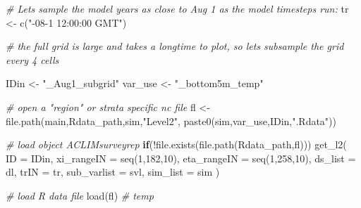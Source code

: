 \documentclass[
]{article}
\newenvironment{Shaded}{\begin{snugshade}}{\end{snugshade}}
\newcommand{\AttributeTok}[1]{\textcolor[rgb]{0.77,0.63,0.00}{#1}}
\newcommand{\CommentTok}[1]{\textcolor[rgb]{0.56,0.35,0.01}{\textit{#1}}}
\newcommand{\ControlFlowTok}[1]{\textcolor[rgb]{0.13,0.29,0.53}{\textbf{#1}}}
\newcommand{\DecValTok}[1]{\textcolor[rgb]{0.00,0.00,0.81}{#1}}
\newcommand{\FunctionTok}[1]{\textcolor[rgb]{0.00,0.00,0.00}{#1}}
\newcommand{\NormalTok}[1]{#1}
\newcommand{\OtherTok}[1]{\textcolor[rgb]{0.56,0.35,0.01}{#1}}
\newcommand{\SpecialCharTok}[1]{\textcolor[rgb]{0.00,0.00,0.00}{#1}}
\newcommand{\StringTok}[1]{\textcolor[rgb]{0.31,0.60,0.02}{#1}}
\begin{document}
\begin{Shaded}
\begin{Highlighting}[]
    
    \CommentTok{\# Let\textquotesingle{}s sample the model years as close to Aug 1 as the model timesteps run:}
\NormalTok{    tr          }\OtherTok{\textless{}{-}} \FunctionTok{c}\NormalTok{(}\StringTok{"{-}08{-}1 12:00:00 GMT"}\NormalTok{) }
    
    \CommentTok{\# the full grid is large and takes a longtime to plot, so let\textquotesingle{}s subsample the grid every 4 cells}
   
\NormalTok{    IDin       }\OtherTok{\textless{}{-}} \StringTok{"\_Aug1\_subgrid"}
\NormalTok{    var\_use    }\OtherTok{\textless{}{-}} \StringTok{"\_bottom5m\_temp"}
    
    \CommentTok{\# open a "region" or strata specific nc file}
\NormalTok{    fl         }\OtherTok{\textless{}{-}} \FunctionTok{file.path}\NormalTok{(main,Rdata\_path,sim,}\StringTok{"Level2"}\NormalTok{,}
                            \FunctionTok{paste0}\NormalTok{(sim,var\_use,IDin,}\StringTok{".Rdata"}\NormalTok{))}
    
    \CommentTok{\# load object \textquotesingle{}ACLIMsurveyrep\textquotesingle{}}
    \ControlFlowTok{if}\NormalTok{(}\SpecialCharTok{!}\FunctionTok{file.exists}\NormalTok{(}\FunctionTok{file.path}\NormalTok{(Rdata\_path,fl)))}
      \FunctionTok{get\_l2}\NormalTok{(}
        \AttributeTok{ID          =}\NormalTok{ IDin,}
        \AttributeTok{xi\_rangeIN  =} \FunctionTok{seq}\NormalTok{(}\DecValTok{1}\NormalTok{,}\DecValTok{182}\NormalTok{,}\DecValTok{10}\NormalTok{),}
        \AttributeTok{eta\_rangeIN =} \FunctionTok{seq}\NormalTok{(}\DecValTok{1}\NormalTok{,}\DecValTok{258}\NormalTok{,}\DecValTok{10}\NormalTok{),}
        \AttributeTok{ds\_list     =}\NormalTok{ dl,}
        \AttributeTok{trIN        =}\NormalTok{ tr,}
        \AttributeTok{sub\_varlist =}\NormalTok{ svl,  }
        \AttributeTok{sim\_list    =}\NormalTok{ sim  )}
    
    \CommentTok{\# load R data file}
    \FunctionTok{load}\NormalTok{(fl)   }\CommentTok{\# temp}
    

\end{Highlighting}
\end{Shaded}
\end{document}
